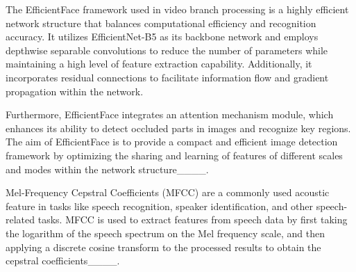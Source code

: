 The EfficientFace framework used in video branch processing is a highly efficient network structure that balances computational efficiency and recognition accuracy. It utilizes EfficientNet-B5 as its backbone network and employs depthwise separable convolutions to reduce the number of parameters while maintaining a high level of feature extraction capability. Additionally, it incorporates residual connections to facilitate information flow and gradient propagation within the network.

Furthermore, EfficientFace integrates an attention mechanism module, which enhances its ability to detect occluded parts in images and recognize key regions. The aim of EfficientFace is to provide a compact and efficient image detection framework by optimizing the sharing and learning of features of different scales and modes within the network structure____.

Mel-Frequency Cepstral Coefficients (MFCC) are a commonly used acoustic feature in tasks like speech recognition, speaker identification, and other speech-related tasks. MFCC is used to extract features from speech data by first taking the logarithm of the speech spectrum on the Mel frequency scale, and then applying a discrete cosine transform to the processed results to obtain the cepstral coefficients____.




